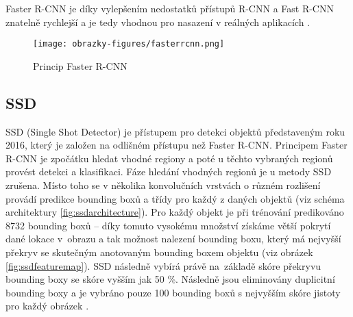 Faster R-CNN je díky vylepšením nedostatků přístupů R-CNN a Fast R-CNN znatelně rychlejší a je tedy vhodnou pro nasazení v reálných aplikacích \cite{ObjectDetectionAlgorithms}.

\begin{figure}[!htbp]
    \centering
    \texttt{[image: obrazky-figures/fasterrcnn.png]}
    \caption{Princip Faster R-CNN \cite{ObjectDetectionAlgorithms}}
    \label{fig:faster}
\end{figure} 

\subsection{SSD}

\iffalse
SSD (Single Shot Detector) je přístupem z roku 2016 pro detekci objektů, která je založena na odlišném principu než Faster R-CNN. Ve Faster R-CNN je hledání vhodných regionů a klasifikace daných regionů rozdělena, v SSD je fáze hledání vhodných regionů zrušena a metoda využívá pouze jednu konvoluční neuronovou síť. Celý vstupní obraz je na začátku přiveden na vstup konvoluční neuronové sítě. Mapy rysů jsou získány v různých měřítkách. Pomocí 3 $\times$ 3 konvolučního filtru jsou vytvořené na mapách rysů bounding boxy definující daný objekt. Najednou je definovaná hranice objektu a i jeho klasifikace do třídy. Bounding boxy se nacházejí na každé z aktivačních map a proto může být detekce provedena na objektech různého měřítka. Síť dokáže tedy získat predikce z map rysů s různě vysokým rozlišením a tak predikovat objekty rozličných velikostí. Při predikci je vypočítáno skóre pro přítomnost každé třídy pro daný objekt a offset bounding boxu pro to, aby dané ohraničení lépe odpovídalo reálnému tvaru objektu. SSD je přístupem, který zvláště díky více vrstvám pro predikci v různých měřítkách objektu, dosahuje dobré přesnosti za snížení trénovacího času a může být tedy nasazeným v reálných aplikacích \cite{SSD, SSDFasterR-CNNComparison}.
\fi

SSD (Single Shot Detector) je přístupem pro detekci objektů představeným roku 2016, který je založen na odlišném přístupu než Faster R-CNN. Principem Faster R-CNN je zpočátku hledat vhodné regiony a poté u těchto vybraných regionů provést detekci a klasifikaci. Fáze hledání vhodných regionů je u metody SSD zrušena. Místo toho se v několika konvolučních vrstvách o různém rozlišení provádí predikce bounding boxů a třídy pro každý z daných objektů (viz schéma architektury \ref{fig:ssdarchitecture}). Pro každý objekt je při trénování predikováno 8732 bounding boxů -- díky tomuto vysokému množství získáme větší pokrytí dané lokace v~obrazu a tak možnost nalezení bounding boxu, který má nejvyšší překryv se skutečným anotovaným bounding boxem objektu (viz obrázek \ref{fig:ssdfeaturemap}). SSD následně vybírá právě na~základě skóre překryvu bounding boxy se skóre vyšším jak 50 \%. Následně jsou eliminovány duplicitní bounding boxy a je vybráno pouze 100 bounding boxů s nejvyšším skóre jistoty pro každý obrázek \cite{SSD, SSDFasterR-CNNComparison}.

